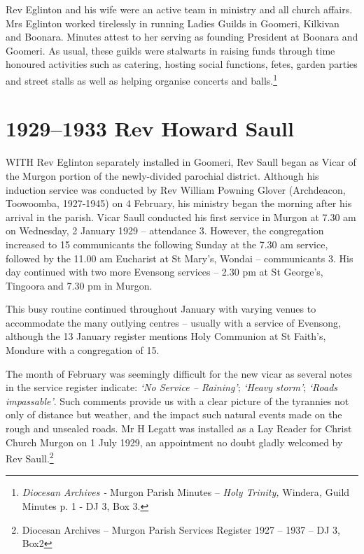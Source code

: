 Rev Eglinton and his wife were an active team in ministry and all church affairs. Mrs Eglinton worked tirelessly in running Ladies Guilds in Goomeri, Kilkivan and Boonara. Minutes attest to her serving as founding President at Boonara and Goomeri. As usual, these guilds were stalwarts in raising funds through time honoured activities such as catering, hosting social functions, fetes, garden parties and street stalls as well as helping organise concerts and balls.\footnote{\emph{Diocesan Archives -} Murgon Parish Minutes -- \emph{Holy Trinity,} Windera\emph{,} Guild Minutes p. 1 - DJ 3, Box 3.}


\balance


\printendnotes[custom]
\setcounter{endnote}{0}
\chapter{1929--1933 Rev Howard Saull}
\nobalance


\lettrine[lines=3]{W}{ITH}
 Rev Eglinton separately installed in Goomeri, Rev Saull began as Vicar of the Murgon portion of the newly-divided parochial district. Although his induction service was conducted by Rev William Powning Glover (Archdeacon, Toowoomba, 1927-1945) on 4 February, his ministry began the morning after his arrival in the parish. Vicar Saull conducted his first service in Murgon at 7.30 am on Wednesday, 2 January 1929 -- attendance 3. However, the congregation increased to 15 communicants the following Sunday at the 7.30 am service, followed by the 11.00 am Eucharist at St Mary's, Wondai -- communicants 3. His day continued with two more Evensong services -- 2.30 pm at St George's, Tingoora and 7.30 pm in Murgon.

This busy routine continued throughout January with varying venues to accommodate the many outlying centres -- usually with a service of Evensong, although the 13 January register mentions Holy Communion at St Faith's, Mondure with a congregation of 15.



The month of February was seemingly difficult for the new vicar as several notes in the service register indicate: \emph{`No Service -- Raining'}; \emph{`Heavy storm'}; \emph{`Roads impassable'}. Such comments provide us with a clear picture of the tyrannies not only of distance but weather, and the impact such natural events made on the rough and unsealed roads. Mr H Legatt was installed as a Lay Reader for Christ Church Murgon on 1 July 1929, an appointment no doubt gladly welcomed by Rev Saull.\footnote{Diocesan Archives -- Murgon Parish Services Register 1927 -- 1937 -- DJ 3, Box2}


